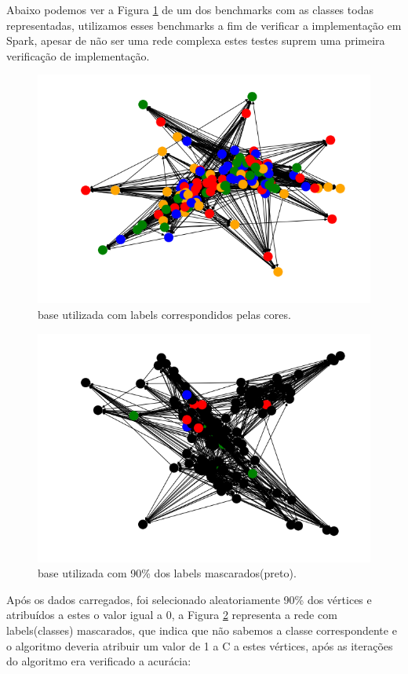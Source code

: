 \documentclass[conference]{IEEEtran}
\begin{document}
 Abaixo podemos ver a Figura \ref{grafo_comlabel}  de um dos benchmarks com as classes todas representadas, utilizamos esses benchmarks a fim de verificar a implementação em Spark, apesar de não ser uma rede complexa estes testes suprem uma primeira verificação de implementação.
 
\begin{figure}[H]
\centerline{\includegraphics[scale=0.4]{grafo.png}}
\caption{base utilizada com labels correspondidos pelas cores.}
\label{grafo_comlabel}
\end{figure}

\begin{figure}[htbp]
\centerline{\includegraphics[scale=0.4]{download.png}}
\caption{base utilizada com 90\% dos labels mascarados(preto).}
\label{grafo_semlabel}
\end{figure}
Após os dados carregados, foi selecionado aleatoriamente 90\% dos vértices e atribuídos a estes o valor igual a 0, a Figura \ref{grafo_semlabel} representa a rede com labels(classes) mascarados, que indica que não sabemos a classe correspondente e o algoritmo deveria atribuir um valor de 1 a C  a estes vértices, após as iterações do algoritmo era verificado a acurácia:
\end{document}
